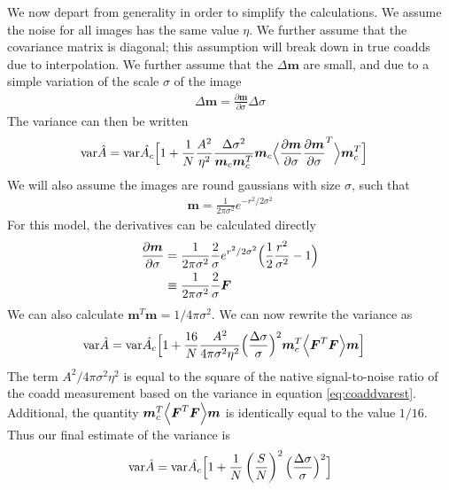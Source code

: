 \documentclass[a4paper,fleqn,usenatbib,referee]{mnras}
\begin{document}
We now depart from generality in order to simplify the calculations.  We assume
the noise for all images has the same value $\eta$. We further assume that the covariance
matrix is diagonal; this assumption will break down in true coadds due to
interpolation.  We further assume that the $\Delta \boldsymbol{m}$ are small,
and due to a simple variation of the scale $\sigma$ of the image
\begin{align}
    \Delta \boldsymbol{m} = \frac{\partial \boldsymbol{m}}{\partial \sigma} \Delta \sigma
\end{align}
The variance can then be written
\begin{align}
    {\rm var}\hat{A} &= {\rm var}\hat{A_c} \Bigl[ 1 + 
        \frac{1}{N}\frac{A^2}{\eta^2} \frac{\Delta \sigma^2}{\boldsymbol{m}_c \boldsymbol{m}_c^T} \boldsymbol{m}_c  \Bigl< \frac{\partial \boldsymbol{m}}{\partial \sigma} \frac{\partial \boldsymbol{m}}{\partial \sigma}^T \Bigr>   \boldsymbol{m}_c^T  \Bigr]
\end{align}
We will also assume the images are round gaussians with size $\sigma$, such that
\begin{align}
    \boldsymbol{m} = \frac{1}{2 \pi \sigma^2} e^{-r^2/2 \sigma^2 }
\end{align}
For this model, the derivatives can be calculated directly
\begin{align}
    \frac{\partial \boldsymbol{m}}{\partial \sigma} &= \frac{1}{2 \pi \sigma^2} \frac{2}{\sigma} e^{r^2/2 \sigma^2} \Bigl( \frac{1}{2}\frac{r^2}{\sigma^2} - 1 \Bigr) \\
    &\equiv \frac{1}{2 \pi \sigma^2} \frac{2}{\sigma} \boldsymbol{F}
\end{align}
We can also calculate $\boldsymbol{m}^T \boldsymbol{m} = 1/4 \pi \sigma^2$. We
can now rewrite the variance as
\begin{align}
    {\rm var}\hat{A} &= {\rm var}\hat{A_c} \Bigl[ 1 + 
        \frac{16}{N}\frac{A^2}{4 \pi \sigma^2 \eta^2} \Bigl( \frac{\Delta \sigma}{\sigma} \Bigr)^2 \boldsymbol{m}_c^T  \Bigl< \boldsymbol{F}^T \boldsymbol{F} \Bigr> \boldsymbol{m} \Bigr]
\end{align}
The term $A^2/4 \pi \sigma^2 \eta^2$ is equal to the square of 
the native signal-to-noise
ratio of the coadd measurement based on the variance in equation \ref{eq:coaddvarest}.
Additional, the quantity $\boldsymbol{m}_c^T  \Bigl< \boldsymbol{F}^T \boldsymbol{F} \Bigr> \boldsymbol{m}$
is identically equal to the value $1/16$.  Thus our final estimate of the variance is
\begin{align} \label{eq:varbasic}
    {\rm var}\hat{A} = {\rm var}\hat{A_c} \Bigl[ 1 + 
        \frac{1}{N} \left( \frac{S}{N} \right)^2 \Bigl( \frac{\Delta \sigma}{\sigma} \Bigr)^2 \Bigr]
\end{align}
\end{document}
